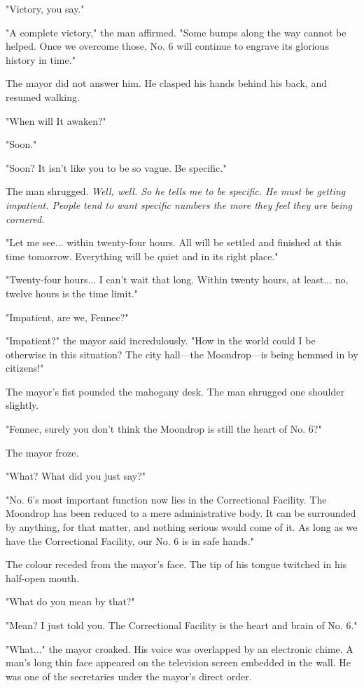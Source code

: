 "Victory, you say."

"A complete victory," the man affirmed. "Some bumps along the way cannot
be helped. Once we overcome those, No. 6 will continue to engrave its
glorious history in time."

The mayor did not answer him. He clasped his hands behind his back, and
resumed walking.

"When will It awaken?"

"Soon."

"Soon? It isn't like you to be so vague. Be specific."

The man shrugged. \emph{Well, well. So he tells me to be specific. He must be
getting impatient. People tend to want specific numbers the more they
feel they are being cornered.}

"Let me see... within twenty-four hours. All will be settled and
finished at this time tomorrow. Everything will be quiet and in its
right place."

"Twenty-four hours... I can't wait that long. Within twenty hours, at
least... no, twelve hours is the time limit."

"Impatient, are we, Fennec?"

"Impatient?" the mayor said incredulously. "How in the world could I be
otherwise in this situation? The city hall---the Moondrop---is being hemmed
in by citizens!"

The mayor's fist pounded the mahogany desk. The man shrugged one
shoulder slightly.

"Fennec, surely you don't think the Moondrop is still the heart of No.
6?"

The mayor froze.

"What? What did you just say?"

"No. 6's most important function now lies in the Correctional Facility.
The Moondrop has been reduced to a mere administrative body. It can be
surrounded by anything, for that matter, and nothing serious would come
of it. As long as we have the Correctional Facility, our No. 6 is in
safe hands."

The colour receded from the mayor's face. The tip of his tongue twitched
in his half-open mouth.

"What do you mean by that?"

"Mean? I just told you. The Correctional Facility is the heart and brain
of No. 6."

"What..." the mayor croaked. His voice was overlapped by an electronic
chime. A man's long thin face appeared on the television screen embedded
in the wall. He was one of the secretaries under the mayor's direct
order.

